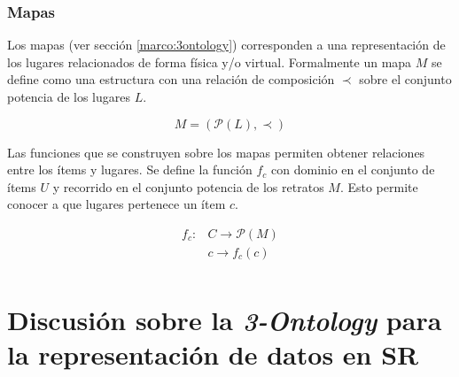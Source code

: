 \subsubsection{Mapas}

Los mapas (ver sección \ref{marco:3ontology}) corresponden a una representación de los lugares relacionados de forma física y/o virtual. Formalmente un mapa $M$ se define como una estructura con una relación de composición $\prec$ sobre el conjunto potencia de los lugares $L$.  

\begin{equation}
\label{modelo:mapas}
	M = (\mathcal{P}(L),\prec)
\end{equation}

Las funciones que se construyen sobre los mapas permiten obtener relaciones entre los ítems y lugares. Se define la función $f_c$ con dominio en el conjunto de ítems $U$ y recorrido en el conjunto potencia de los retratos $M$. Esto permite conocer a que lugares pertenece un ítem $c$.

\begin{equation}
\label{modelo:funcionitemmapa}
\begin{aligned}
		f_c\colon& C \rightarrow \mathcal{P}(M)\\
		& c \rightarrow f_c(c)\\
	\end{aligned}
\end{equation}








\section{Discusi\'on sobre la \textit{3-Ontology} para la representaci\'on de datos en SR}

